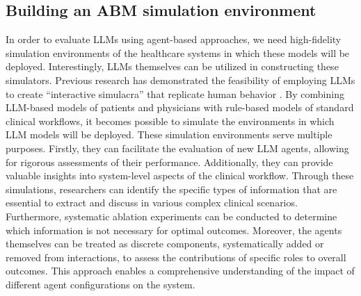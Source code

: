 \documentclass[10pt]{article}
\begin{document}
\begin{multicols}{2}
\section{Building an ABM simulation environment}
In order to evaluate LLMs using agent-based approaches, we need high-fidelity simulation environments of the healthcare systems in which these models will be deployed. Interestingly, LLMs themselves can be utilized in constructing these simulators. Previous research has demonstrated the feasibility of employing LLMs to create “interactive simulacra” that replicate human behavior \cite{park2023generative, yang2023auto}. By combining LLM-based models of patients and physicians with rule-based models of standard clinical workflows, it becomes possible to simulate the environments in which LLM models will be deployed. These simulation environments serve multiple purposes. Firstly, they can facilitate the evaluation of new LLM agents, allowing for rigorous assessments of their performance. Additionally, they can provide valuable insights into system-level aspects of the clinical workflow. Through these simulations, researchers can identify the specific types of information that are essential to extract and discuss in various complex clinical scenarios. Furthermore, systematic ablation experiments can be conducted to determine which information is not necessary for optimal outcomes. Moreover, the agents themselves can be treated as discrete components, systematically added or removed from interactions, to assess the contributions of specific roles to overall outcomes. This approach enables a comprehensive understanding of the impact of different agent configurations on the system.


\end{multicols}
\end{document}
